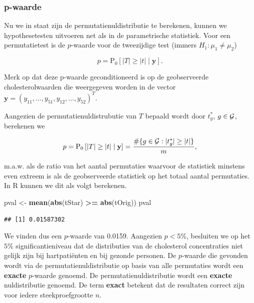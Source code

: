 \documentclass[
  12pt,dutch]{book}
\newenvironment{Shaded}{\begin{snugshade}}{\end{snugshade}}
\newcommand{\FunctionTok}[1]{\textcolor[rgb]{0.13,0.29,0.53}{\textbf{#1}}}
\newcommand{\NormalTok}[1]{#1}
\newcommand{\OtherTok}[1]{\textcolor[rgb]{0.56,0.35,0.01}{#1}}
\newcommand{\SpecialCharTok}[1]{\textcolor[rgb]{0.81,0.36,0.00}{\textbf{#1}}}
\theoremstyle{definition}
\theoremstyle{definition}
\theoremstyle{definition}
\theoremstyle{definition}
\theoremstyle{remark}
\begin{document}
\subsubsection{p-waarde}\label{p-waarde}

Nu we in staat zijn de permutatienuldistributie te berekenen, kunnen we hypothesetesten uitvoeren net als in de parametrische statistiek.
Voor een permutatietest is de \(p\)-waarde voor de tweezijdige test (immers \(H_1: \mu_1 \neq \mu_2\))

\[p=\text{P}_0\left[\vert T\vert \geq \vert t\vert \mid \mathbf{y}\right].\]

Merk op dat deze p-waarde geconditioneerd is op de geobserveerde cholesterolwaarden die weergegeven worden in de vector \(\mathbf{y}=(y_{11},\ldots,y_{51},y_{12},\ldots,y_{52})^T\).

Aangezien de permutatienuldistrubutie van \(T\) bepaald wordt door \(t^*_g\), \(g \in{\cal{G}}\), berekenen we

\[p  = \text{P}_0\left[\left\vert T\right\vert \geq \left\vert t\right\vert \mid \mathbf{y}\right] = \frac{\#\{g\in {\cal{G}}: \vert t^*_g\vert \geq \vert t \vert \}}{m},\]

m.a.w. als de ratio van het aantal permutaties waarvoor de statistiek minstens even extreem is als de geobserveerde statistiek op het totaal aantal permutaties. In R kunnen we dit als volgt berekenen.

\begin{Shaded}
\begin{Highlighting}[]
\NormalTok{pval }\OtherTok{\textless{}{-}} \FunctionTok{mean}\NormalTok{(}\FunctionTok{abs}\NormalTok{(tStar) }\SpecialCharTok{\textgreater{}=} \FunctionTok{abs}\NormalTok{(tOrig))}
\NormalTok{pval}
\end{Highlighting}
\end{Shaded}

\begin{verbatim}
## [1] 0.01587302
\end{verbatim}

We vinden dus een \(p\)-waarde van 0.0159. Aangezien \(p<5\%\), besluiten we op het \(5\%\) significantieniveau dat de distributies van de cholesterol concentraties niet gelijk zijn bij hartpatiënten en bij gezonde personen.
De \(p\)-waarde die gevonden wordt via de permutatienuldistributie op basis van alle permutaties wordt een \textbf{exacte} \(p\)-waarde genoemd. De permutatienuldistributie wordt een \textbf{exacte} nuldistributie genoemd. De term \textbf{exact} betekent dat de resultaten correct zijn voor iedere steekproefgrootte \(n\).
\end{document}
